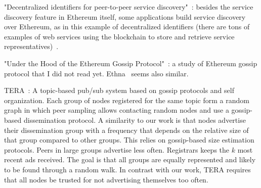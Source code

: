 "Decentralized identifiers for peer-to-peer service discovery"~\cite{farmer2021decentralized}: besides the service discovery feature in Ethereum itself, some applications build service discovery over Ethereum, as in this example of decentralized identifiers (there are tons of examples of web services using the blockchain to store and retrieve service representatives)~\cite{keizer2021flock}.

"Under the Hood of the Ethereum Gossip Protocol"~\cite{kiffer2021under}: a study of Ethereum gossip protocol that I did not read yet.
Ethna~\cite{wang2021ethna} seems also similar.

TERA~\cite{baldoni2007tera}: A topic-based pub/sub system based on gossip protocols and self organization. Each group of nodes registered for the same topic form a random graph in which peer sampling allows contacting random nodes and use a gossip-based dissemination protocol. A similarity to our work is that nodes advertise their dissemination group with a frequency that depends on the relative size of that group compared to other groups. This relies on gossip-based size estimation protocols. Peers in large groups advertise less often. Registrars keeps the $k$ most recent ads received. The goal is that all groups are equally represented and likely to be found through a random walk. In contrast with our work, TERA requires that all nodes be trusted for not advertising themselves too often.
